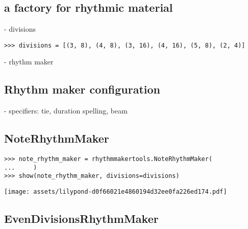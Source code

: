\subsection{a factory for rhythmic material}

- divisions

\begin{comment}
<abjad>
divisions = [(3, 8), (4, 8), (3, 16), (4, 16), (5, 8), (2, 4)]
</abjad>
\end{comment}

\begin{singlespacing}
\vspace{-0.5\baselineskip}
\begin{lstlisting}
>>> divisions = [(3, 8), (4, 8), (3, 16), (4, 16), (5, 8), (2, 4)]
\end{lstlisting}
\end{singlespacing}

- rhythm maker

\subsection{Rhythm maker configuration}

- specifiers: tie, duration spelling, beam

\subsection{NoteRhythmMaker}

\begin{comment}
<abjad>
note_rhythm_maker = rhythmmakertools.NoteRhythmMaker(
    )
show(note_rhythm_maker, divisions=divisions)
</abjad>
\end{comment}

\begin{singlespacing}
\vspace{-0.5\baselineskip}
\begin{lstlisting}
>>> note_rhythm_maker = rhythmmakertools.NoteRhythmMaker(
...     )
>>> show(note_rhythm_maker, divisions=divisions)
\end{lstlisting}
\texttt{[image: assets/lilypond-d0f66021e4860194d32ee0fa226ed174.pdf]}
\end{singlespacing}

\subsection{EvenDivisionsRhythmMaker}

